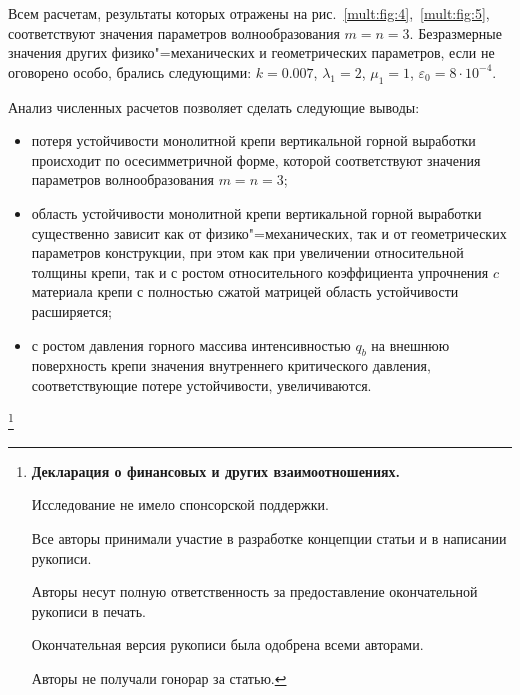 Всем расчетам, результаты которых отражены на рис.~\ref{mult:fig:4},~\ref{mult:fig:5}, соответствуют значения параметров волнообразования $m=n=3$. Безразмерные значения других физико"=механических и геометрических параметров, если не оговорено особо, брались следующими: $k=0.007$, $\lambda_1=2$, $\mu_1=1$, ${\varepsilon_0=8 \cdot 10^{-4}}$.



Анализ численных расчетов позволяет сделать следующие выводы:



\begin{itemize}



\item[--] потеря устойчивости монолитной крепи вертикальной горной выработки происходит по осесимметричной форме, которой соответствуют значения параметров волнообразования $m=n=3$;



\item[--] область устойчивости монолитной крепи вертикальной горной выработки существенно зависит как от физико"=механических, так и от геометрических параметров конструкции, при этом как при увеличении относительной толщины крепи, так и с ростом относительного коэффициента упрочнения $c$ материала крепи с полностью сжатой матрицей область устойчивости расширяется;



\item[--] с ростом давления горного массива интенсивностью $q_b$ на внешнюю поверхность крепи значения внутреннего критического давления, соответствующие потере устойчивости, увеличиваются.





\end{itemize}





\thanks{{\bf Декларация о финансовых и других взаимоотношениях.}

Исследование не имело спонсорской поддержки. 

Все  авторы  принимали  участие  в  разработке  концепции  \mbox{статьи}  и  в  написании  рукописи. 

Авторы несут  полную  ответственность  за  предоставление  окончательной рукописи в печать.

Окончательная  версия рукописи была одобрена всеми авторами.

Авторы не получали гонорар за статью.

}





